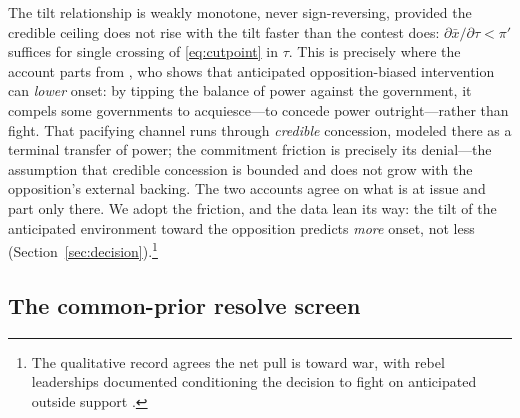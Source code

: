 The tilt relationship is weakly monotone, never sign-reversing, provided the
credible ceiling does not rise with the tilt faster than the contest does:
$\partial \bar{x}/\partial \tau < \pi'$ suffices for single crossing of
\eqref{eq:cutpoint} in $\tau$.
This is precisely where the account parts from \citet{lango2023}, who shows
that anticipated opposition-biased intervention can \emph{lower} onset: by
tipping the balance of power against the government, it compels some
governments to acquiesce---to concede power outright---rather than fight.
That pacifying channel runs through \emph{credible} concession, modeled there
as a terminal transfer of power; the commitment friction is precisely its
denial---the assumption that credible concession is bounded and does not grow
with the opposition's external backing.  The two accounts agree on what is at
issue and part only there.  We adopt the friction, and the data lean its
way: the tilt of the anticipated environment toward the opposition
predicts \emph{more} onset, not less
(Section~\ref{sec:decision}).\footnote{The qualitative record agrees the net
pull is toward war, with rebel leaderships documented conditioning the
decision to fight on anticipated outside support \citep{kuperman2008,
kyddstraus2013}.}

\subsection{The common-prior resolve screen}
\label{app:screen}

